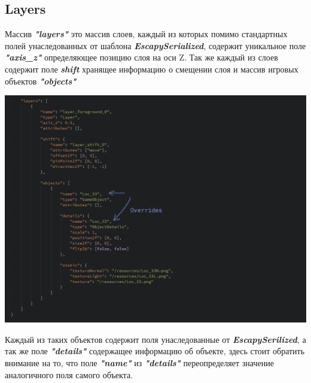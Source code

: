 \documentclass[11pt]{report}
\begin{document}
\subsection{Layers}
Массив \textit{\textbf{"layers"}} это массив слоев, каждый из которых помимо стандартных полей унаследованных от шаблона \textit{\textbf{EscapySerialized}}, содержит уникальное поле \textit{\textbf{"axis\_z"}} определяющее позицию слоя на оси Z. Так же каждый из слоев содержит поле \textit{\textbf{shift}} хранящее информацию о смещении слоя и массив игровых объектов \textit{\textbf{"objects"}}
\begin{center}
	\includegraphics[width=1.2\linewidth]{img/20.png} 
  	\label{img:200} 
\end{center} 
Каждый из таких объектов содержит поля унаследованные от \textit{\textbf{EscapySerilized}}, а так же поле \textit{\textbf{"details"}} содержащее информацию об объекте, здесь стоит обратить внимание на то, что поле \textit{\textbf{"name"}} из \textit{\textbf{"details"}} переопределяет значение аналогичного поля самого объекта.
\end{document}
